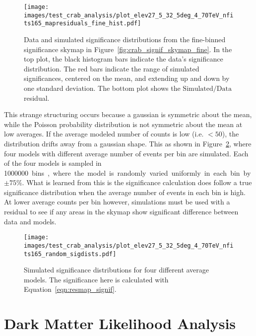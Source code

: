   \begin{figure}[h]
    \centering
    \texttt{[image: images/test\_crab\_analysis/plot\_elev27\_5\_32\_5deg\_4\_70TeV\_nfits165\_mapresiduals\_fine\_hist.pdf]}
    \caption[Crab Residual Bin Distribution]{
      Data and simulated significance distributions from the fine-binned significance skymap in Figure~\ref{fig:crab_signif_skymap_fine}.
      In the top plot, the black histogram bars indicate the data's significance distribution.
      The red bars indicate the range of simulated significances, centered on the mean, and extending up and down by one standard deviation.
      The bottom plot shows the $\textrm{Simulated}/\textrm{Data}$ residual.
    }
    \label{fig:crab_signif_distribution}
  \end{figure}
  
  This strange structuring occurs because a gaussian is symmetric about the mean, while the Poisson probability distribution is not symmetric about the mean at low averages.
  If the average modeled number of counts is low (i.e. $<50$), the distribution drifts away from a gaussian shape.
  This as shown in Figure~\ref{fig:various_sig_dists}, where four models with different average number of events per bin are simulated.
  Each of the four models is sampled in \SI{1000000} bins, where the model is randomly varied uniformly in each bin by $\pm 75\%$.
  What is learned from this is the significance calculation does follow a true significance distribution when the average number of events in each bin is high.
  At lower average counts per bin however, simulations must be used with a residual to see if any areas in the skymap show significant difference between data and models.
  
  \begin{figure}[h]
    \centering
    \texttt{[image: images/test\_crab\_analysis/plot\_elev27\_5\_32\_5deg\_4\_70TeV\_nfits165\_random\_sigdists.pdf]}
    \caption[4 Simulated Significance Distributions]{
      Simulated significance distributions for four different average models.
      The significance here is calculated with Equation~\ref{eqn:resmap_signif}.
    }
    \label{fig:various_sig_dists}
  \end{figure}

  \FloatBarrier

\section{Dark Matter Likelihood Analysis}\label{sec:dmlike}
  
